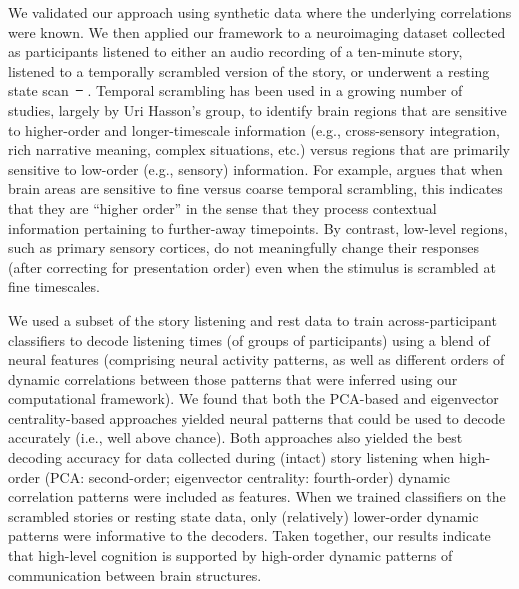 \documentclass[english]{article}
\providecommand{\DIFaddtex}[1]{{\protect\color{blue}\uwave{#1}}} %
\providecommand{\DIFdeltex}[1]{{\protect\color{red}\sout{#1}}}                      %
\providecommand{\DIFaddbegin}{} %
\providecommand{\DIFaddend}{} %
\providecommand{\DIFdelbegin}{} %
\providecommand{\DIFdelend}{} %
\providecommand{\DIFadd}[1]{\texorpdfstring{\DIFaddtex{#1}}{#1}} %
\providecommand{\DIFdel}[1]{\texorpdfstring{\DIFdeltex{#1}}{}} %
\newcommand{\DIFscaledelfig}{0.5}
\newlength{\DIFdelgraphicswidth} %
\newlength{\DIFdelgraphicsheight} %
\newcommand{\DIFaddincludegraphics}[2][]{{\color{blue}\fbox{\DIFOincludegraphics[#1]{#2}}}} %
\newcommand{\DIFdelincludegraphics}[2][]{%
\sbox{\DIFdelgraphicsbox}{\DIFOincludegraphics[#1]{#2}}%
\settoboxwidth{\DIFdelgraphicswidth}{\DIFdelgraphicsbox} %
\settoboxtotalheight{\DIFdelgraphicsheight}{\DIFdelgraphicsbox} %
\scalebox{\DIFscaledelfig}{%
\parbox[b]{\DIFdelgraphicswidth}{\usebox{\DIFdelgraphicsbox}\\[-\baselineskip] \rule{\DIFdelgraphicswidth}{0em}}\llap{\resizebox{\DIFdelgraphicswidth}{\DIFdelgraphicsheight}{%
\setlength{\unitlength}{\DIFdelgraphicswidth}%
\begin{picture}(1,1)%
\thicklines\linethickness{2pt} %
{\color[rgb]{1,0,0}\put(0,0){\framebox(1,1){}}}%
{\color[rgb]{1,0,0}\put(0,0){\line( 1,1){1}}}%
{\color[rgb]{1,0,0}\put(0,1){\line(1,-1){1}}}%
\end{picture}%
}\hspace*{3pt}}} %
} %
\DeclareRobustCommand{\DIFaddbegin}{\DIFOaddbegin \let\includegraphics\DIFaddincludegraphics} %
\DeclareRobustCommand{\DIFaddend}{\DIFOaddend \let\includegraphics\DIFOincludegraphics} %
\DeclareRobustCommand{\DIFdelbegin}{\DIFOdelbegin \let\includegraphics\DIFdelincludegraphics} %
\DeclareRobustCommand{\DIFdelend}{\DIFOaddend \let\includegraphics\DIFOincludegraphics} %
\begin{document}
We validated our approach using synthetic data where the underlying
correlations were known.  We then applied our framework to a
neuroimaging dataset collected as participants listened to either an
audio recording of a ten-minute story, listened to a temporally
scrambled version of the story, or underwent a resting state
scan~\DIFdelbegin \DIFdel{\mbox{%
\citep{SimoEtal16}}\hspace{0pt}%
}\DIFdelend \DIFaddbegin \DIFadd{\mbox{%
\cite{SimoEtal16}}\hspace{0pt}%
}\DIFaddend .  Temporal scrambling has been used in a
growing number of studies, largely by Uri Hasson's group, to identify
brain regions that are sensitive to higher-order and longer-timescale
information (e.g., cross-sensory integration, rich narrative meaning,
complex situations, etc.) versus regions that are primarily sensitive
to low-order (e.g., sensory) information.  For example,
\cite{HassEtal08} argues that when brain areas are sensitive to fine
versus coarse temporal scrambling, this indicates that they are
``higher order'' in the sense that they process contextual information
pertaining to further-away timepoints.  By contrast, low-level
regions, such as primary sensory cortices, do not meaningfully change
their responses (after correcting for presentation order) even when
the stimulus is scrambled at fine timescales.

We used a subset of the story listening and rest data to train
across-participant classifiers to decode listening times (of groups of
participants) using a blend of neural features (comprising neural
activity patterns, as well as different orders of dynamic correlations
between those patterns that were inferred using our computational
framework).  We found that both the PCA-based and eigenvector
centrality-based approaches yielded neural patterns that could be used
to decode accurately (i.e., well above chance).  Both approaches also
yielded the best decoding accuracy for data collected during (intact)
story listening when high-order (PCA: second-order; eigenvector
centrality: fourth-order) dynamic correlation patterns were included
as features.  When we trained classifiers on the scrambled stories or
resting state data, only (relatively) lower-order dynamic patterns
were informative to the decoders.  Taken together, our results
indicate that high-level cognition is supported by high-order dynamic
patterns of communication between brain structures.
\end{document}
